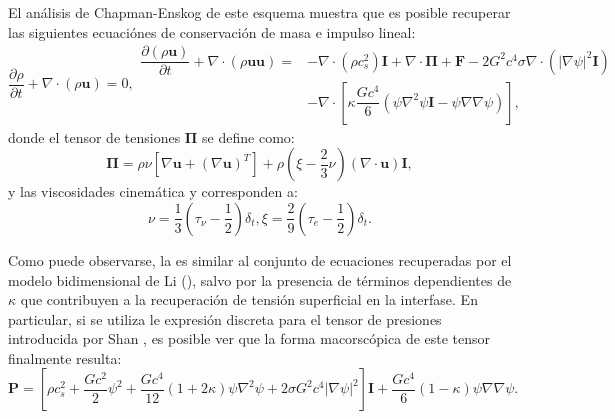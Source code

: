 El an\'alisis de Chapman-Enskog de este esquema muestra que es posible recuperar las siguientes ecuaci\'ones de conservaci\'on de masa e impulso lineal:
\begin{subequations}
	\begin{equation}
		\dfrac{\partial \rho}{\partial t} + \nabla \cdot (\rho \bm{u}) = 0,
	\end{equation}
	\begin{equation}
		\begin{aligned}
		\dfrac{\partial(\rho\bm{u})}{\partial t} + \nabla \cdot (\rho \bm{u} \bm{u})  = &-\nabla \cdot(\rho c_s^2)\bm{I} + \nabla \cdot \bm{\Pi} + \bm{F} - 2G^2 c^4 \sigma \nabla \cdot (|\nabla \psi|^2 \bm{I}) \\
		& -\nabla \cdot \left[ \kappa \dfrac{Gc^4}{6} (\psi \nabla^2 \psi \bm{I} - \psi \nabla \nabla \psi) \right],
		\end{aligned}
	\end{equation}
	\label{eq:xu_macro}
\end{subequations}
donde el tensor de tensiones $\bm{\Pi}$ se define como:
\begin{equation}
	\bm{\Pi} = \rho \nu \left[ \nabla \bm{u} + (\nabla \bm{u})^T \right] + \rho \left( \xi - \dfrac{2}{3}\nu \right) (\nabla \cdot \bm{u})\bm{I},
\end{equation}
y las viscosidades cinem\'atica y  corresponden a:
\begin{subequations}
	\begin{equation}
		\nu = \dfrac{1}{3} \left( \tau_{\nu} - \dfrac{1}{2}\right) \delta_t,
	\end{equation}
	\begin{equation}
		\xi = \dfrac{2}{9} \left( \tau_{e} - \dfrac{1}{2}\right) \delta_t.
	\end{equation}	
\end{subequations}

Como puede observarse, la  es similar al conjunto de ecuaciones recuperadas por el modelo bidimensional de Li (), salvo por la presencia de t\'erminos dependientes de $\kappa$ que contribuyen a la recuperaci\'on de tensi\'on superficial en la interfase. En particular, si se utiliza le expresi\'on discreta para el tensor de presiones introducida por Shan \cite{shan_pressure_2008}, es posible ver que la forma macorsc\'opica de este tensor finalmente resulta:
\begin{equation}
	\bm{P} = \left[ \rho c_s^2 + \dfrac{G c^2}{2} \psi^2 + \dfrac{G c^4}{12} (1+2\kappa) \psi \nabla^2 \psi + 2 \sigma G^2 c^4 |\nabla \psi|^2\right] \bm{I} + \dfrac{G c^4}{6} (1-\kappa) \psi \nabla \nabla \psi.
\end{equation}


